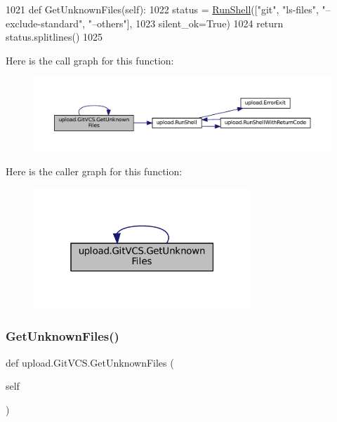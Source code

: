 \begin{DoxyCode}
1021   \textcolor{keyword}{def }GetUnknownFiles(self):
1022     status = \hyperlink{namespaceupload_adddc423c49132e8879cbb25d6be2cf11}{RunShell}([\textcolor{stringliteral}{"git"}, \textcolor{stringliteral}{"ls-files"}, \textcolor{stringliteral}{"--exclude-standard"}, \textcolor{stringliteral}{"--others"}],
1023                       silent\_ok=\textcolor{keyword}{True})
1024     \textcolor{keywordflow}{return} status.splitlines()
1025 
\end{DoxyCode}
Here is the call graph for this function\+:
\nopagebreak
\begin{figure}[H]
\begin{center}
\leavevmode
\includegraphics[width=350pt]{classupload_1_1GitVCS_ae4e8c0e9fa01619c6a5c76d1ab84b995_cgraph}
\end{center}
\end{figure}
Here is the caller graph for this function\+:
\nopagebreak
\begin{figure}[H]
\begin{center}
\leavevmode
\includegraphics[width=232pt]{classupload_1_1GitVCS_ae4e8c0e9fa01619c6a5c76d1ab84b995_icgraph}
\end{center}
\end{figure}
\mbox{\label{classupload_1_1GitVCS_ae4e8c0e9fa01619c6a5c76d1ab84b995}} 
\subsubsection{\texorpdfstring{Get\+Unknown\+Files()}{GetUnknownFiles()}\hspace{0.1cm}{\footnotesize\ttfamily [2/2]}}
{\footnotesize\ttfamily def upload.\+Git\+V\+C\+S.\+Get\+Unknown\+Files (\begin{DoxyParamCaption}\item[{}]{self }\end{DoxyParamCaption})}



